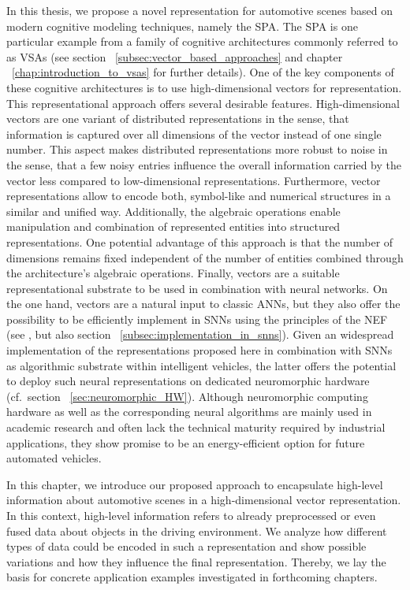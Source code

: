 In this thesis, we propose a novel representation for automotive scenes based on modern cognitive modeling techniques, namely the \ac{SPA}.
The \ac{SPA} is one particular example from a family of cognitive architectures commonly referred to as \acp{VSA} (see section ~\ref{subsec:vector_based_approaches} and chapter ~\ref{chap:introduction_to_vsas} for further details).
One of the key components of these cognitive architectures is to use high-dimensional vectors for representation.
This representational approach offers several desirable features.
High-dimensional vectors are one variant of distributed representations in the sense, that information is captured over all dimensions of the vector instead of one single number.
This aspect makes distributed representations more robust to noise in the sense, that a few noisy entries influence the overall information carried by the vector less compared to low-dimensional representations.
Furthermore, vector representations allow to encode both, symbol-like and numerical structures in a similar and unified way.
Additionally, the algebraic operations enable manipulation and combination of represented entities into structured representations.
One potential advantage of this approach is that the number of dimensions remains fixed independent of the number of entities combined through the architecture's algebraic operations.
Finally, vectors are a suitable representational substrate to be used in combination with neural networks.
On the one hand, vectors are a natural input to classic \acp{ANN}, but they also offer the possibility to be efficiently implement in \acp{SNN} using the principles of the \ac{NEF} (see \cite{Eliasmith2013}, but also section ~\ref{subsec:implementation_in_snns}).
Given an widespread implementation of the representations proposed here in combination with \acp{SNN} as algorithmic substrate within intelligent vehicles, the latter offers the potential to deploy such neural representations on dedicated neuromorphic hardware (cf.\ section ~\ref{sec:neuromorphic_HW}).
Although neuromorphic computing hardware as well as the corresponding neural algorithms are mainly used in academic research and often lack the technical maturity required by industrial applications, they show promise to be an energy-efficient option for future automated vehicles.

In this chapter, we introduce our proposed approach to encapsulate high-level information about automotive scenes in a high-dimensional vector representation.
In this context, high-level information refers to already preprocessed or even fused data about objects in the driving environment.
We analyze how different types of data could be encoded in such a representation and show possible variations and how they influence the final representation.
Thereby, we lay the basis for concrete application examples investigated in forthcoming chapters.

